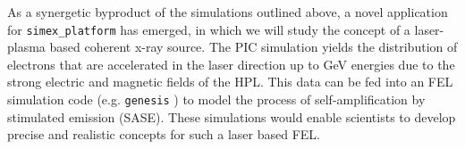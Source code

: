 \documentclass[12pt]{scrartcl}
\begin{document}
As a synergetic byproduct of the simulations outlined above, a
novel application for \texttt{simex\_platform} has emerged,
in which we will
study the concept of a laser-plasma based coherent x-ray source. The PIC
simulation yields the distribution of electrons that are accelerated in the
laser direction up to GeV energies due to the strong electric and
magnetic fields of the HPL. This data can be fed into an FEL simulation code
(e.g. \texttt{genesis} \cite{Reiche1999}) to model the process of
self-amplification by stimulated emission (SASE). These simulations would enable
scientists to develop precise and realistic concepts for such a laser based FEL.

\end{document}
